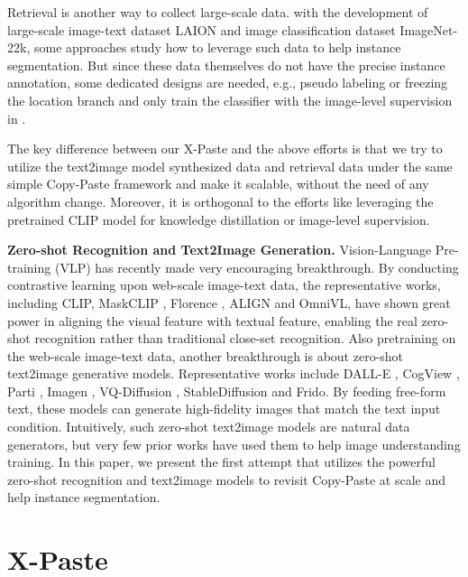 \documentclass{article}
\begin{document}
Retrieval is another way to collect large-scale data. with the development of large-scale image-text dataset LAION\cite{laion} and image classification dataset ImageNet-22k\cite{deng2009imagenet}, some approaches \cite{PromptDet,Detic,hong2017weakly,jin2017webly,shen2018bootstrapping,wei2016stc} study how to leverage such data to help instance segmentation. But since these data themselves do not have the precise instance annotation, some dedicated designs are needed, e.g., pseudo labeling \cite{RegionCLIP} or freezing the location branch and only train the classifier with the image-level supervision in \cite{Detic}.

The key difference between our X-Paste and the above efforts is that we try to utilize the text2image model synthesized data and retrieval data under the same simple Copy-Paste framework and make it scalable, without the need of any algorithm change. Moreover, it is orthogonal to the efforts like leveraging the pretrained CLIP model for knowledge distillation or image-level supervision. 

\noindent \textbf{Zero-shot Recognition and Text2Image Generation.}
Vision-Language Pre-training (VLP) has recently made very encouraging breakthrough. By conducting contrastive learning upon web-scale image-text data, the representative works, including CLIP\cite{CLIP}, MaskCLIP \cite{dong2022maskclip}, Florence \cite{yuan2021florence}, ALIGN\cite{ALIGN} and OmniVL\cite{wang2022omnivl}, have shown great power in aligning the visual feature with textual feature, enabling the real zero-shot recognition rather than traditional close-set recognition. Also pretraining on the web-scale image-text data, another breakthrough is about zero-shot text2image generative models. Representative works include DALL-E \cite{dalle,glide,dalle2}, CogView \cite{cogview}, Parti \cite{parti}, Imagen \cite{imagen}, VQ-Diffusion \cite{gu2022vector}, StableDiffusion\cite{ldm} and Frido\cite{fan2023frido}. By feeding free-form text, these models can generate high-fidelity images that match the text input condition. Intuitively, such zero-shot text2image models are natural data generators, but very few prior works have used them to help image understanding training. In this paper, we present the first attempt that utilizes the powerful zero-shot recognition and text2image models to revisit Copy-Paste at scale and help instance segmentation. 


\section{X-Paste}
\label{sec:method}
\end{document}
